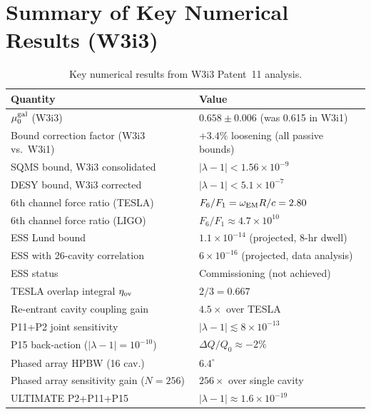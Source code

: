 \documentclass[11pt,twocolumn]{article}
\newcommand{\lam}{\lambda}
\newcommand{\ee}[1]{\times 10^{#1}}
\begin{document}
\section*{Summary of Key Numerical Results (W3i3)}

\begin{table}[h!]
\caption{Key numerical results from W3i3 Patent~11 analysis.}
\begin{tabular}{ll}
\toprule
Quantity & Value \\
\midrule
$\mu_0^{\rm gal}$ (W3i3) & $0.658\pm0.006$ (was 0.615 in W3i1) \\
Bound correction factor (W3i3 vs.\ W3i1) & $+3.4\%$ loosening (all passive bounds) \\
SQMS bound, W3i3 consolidated & $|\lam-1| < 1.56\ee{-9}$ \\
DESY bound, W3i3 corrected & $|\lam-1| < 5.1\ee{-7}$ \\
6th channel force ratio (TESLA) & $F_6/F_1 = \omega_{\rm EM}R/c = 2.80$ \\
6th channel force ratio (LIGO) & $F_6/F_1 \approx 4.7\ee{10}$ \\
ESS Lund bound & $1.1\ee{-14}$ (projected, 8-hr dwell) \\
ESS with 26-cavity correlation & $6\ee{-16}$ (projected, data analysis) \\
ESS status & Commissioning (not achieved) \\
TESLA overlap integral $\eta_{\rm ov}$ & $2/3 = 0.667$ \\
Re-entrant cavity coupling gain & $4.5\times$ over TESLA \\
P11+P2 joint sensitivity & $|\lam-1| \lesssim 8\ee{-13}$ \\
P15 back-action ($|\lam-1|=10^{-10}$) & $\Delta Q/Q_0 \approx -2\%$ \\
Phased array HPBW (16 cav.) & $6.4^\circ$ \\
Phased array sensitivity gain ($N = 256$) & $256\times$ over single cavity \\
ULTIMATE P2+P11+P15 & $|\lam-1| \approx 1.6\ee{-19}$ \\
\bottomrule
\end{tabular}
\end{table}
\end{document}
